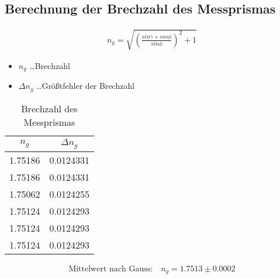 \documentclass[a4paper]{article}
\begin{document}
\subsection{Berechnung der Brechzahl des Messprismas}
\begin{align}
  n_g=\sqrt{\left(\frac{sin \gamma + cos \phi}{sin \phi}\right)^2+1}
\end{align}
\begin{table}[ht]
  \centering
  \caption{Brechzahl des Messprismas}
  \begin{itemize}
    \item $n_g$ \dots Brechzahl
    \item $\Delta n_g$ \dots Größtfehler der Brechzahl
  \end{itemize}
  \begin{tabular}{|c|c|}\hline
    $n_g$&$\Delta n_g$\\\hline
    1.75186 & 0.0124331 \\\hline
    1.75186 & 0.0124331 \\\hline
    1.75062 & 0.0124255 \\\hline
    1.75124 & 0.0124293 \\\hline
    1.75124 & 0.0124293 \\\hline
    1.75124 & 0.0124293 \\\hline
  \end{tabular}
  \label{tab:brechzahlglas}
\end{table}
\begin{align}
  \text{Mittelwert nach Gauss:}\quad
  n_g = 1.7513\pm0.0002 
\end{align}
\end{document}
